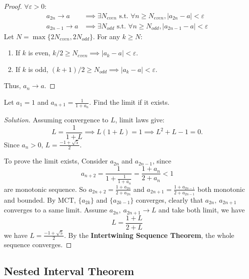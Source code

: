 \documentclass[
	UTF-8,
	11pt, %
	a4paper, %
]{LegrandOrangeBook}
\begin{document}
        \begin{proof}
        $\forall \varepsilon > 0$:
        \begin{align*}
            a_{2n} \to a &\implies \exists N_{even} \text{ s.t. } \forall n \ge N_{even}, |a_{2n} - a| < \varepsilon \\
            a_{2n-1} \to a &\implies \exists N_{odd} \text{ s.t. } \forall n \ge N_{odd}, |a_{2n-1} - a| < \varepsilon
        \end{align*}
        Let $N = \max\{2N_{even}, 2N_{odd}\}$. For any $k \ge N$:
        \begin{enumerate}
            \item If $k$ is even, $k/2 \ge N_{even} \implies |a_k - a| < \varepsilon$.
            \item If $k$ is odd, $(k+1)/2 \ge N_{odd} \implies |a_k - a| < \varepsilon$.
        \end{enumerate}
        Thus, $a_n \to a$.
        \end{proof}
        
        \newpage

        \begin{example}
        Let $a_1 = 1$ and $a_{n+1} = \frac{1}{1 + a_n}$. Find the limit if it exists.
        \begin{proof}[Solution]
        Assuming convergence to $L$, limit laws give:
        \[ L = \frac{1}{1+L} \implies L(1+L) = 1 \implies L^2 + L - 1 = 0. \]
        Since $a_n > 0$, $L = \frac{-1 + \sqrt{5}}{2}$.

        To prove the limit exists, Consider $a_{2n}$ and $a_{2n-1}$, since
        $$a_{n+2} = \frac{1}{1 + \frac{1}{1+a_n}} = \frac{1+a_n}{2+a_n}<1$$
        are monotonic sequence. 
        So $a_{2n+2} = \frac{1+a_{2n}}{2+a_{2n}}$ and $a_{2n+1} = \frac{1+a_{2n-1}}{2+a_{2n-1}}$ 
        both monotonic and bounded.
        By MCT, $\{a_{2k}\}$ and $\{a_{2k-1}\}$ converges, clearly that $a_{2n},\ a_{2n+1}$ 
        converges to a same limit. Assume $a_{2n},\ a_{2n+1} \to L$ and take both limit, we have 
        $$L = \frac{1+L}{2+L}$$
        we have $L = \frac{-1 + \sqrt{5}}{2}$.
        By the \textbf{Intertwining Sequence Theorem}, the whole sequence converges.
        \end{proof}
        
        \end{example}

        \newpage

    \subsection{Nested Interval Theorem}
\end{document}
